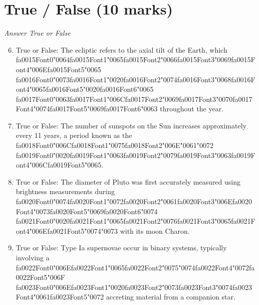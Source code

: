 \documentclass[12pt]{article}
\begin{document}
\section*{True / False (10 marks)}
\textit{Answer True or False}
\begin{enumerate}[label=\arabic*.]
\setcounter{enumi}{5}
\item True or False: The ecliptic refers to the axial tilt of the Earth, which {\csname fa0015Font0\endcsname\char"0064}{\csname fa0015Font1\endcsname\char"0065}{\csname fa0015Font2\endcsname\char"0066}{\csname fa0015Font3\endcsname\char"0069}{\csname fa0015Font4\endcsname\char"006E}{\csname fa0015Font5\endcsname\char"0065} {\csname fa0016Font0\endcsname\char"0073}{\csname fa0016Font1\endcsname\char"0020}{\csname fa0016Font2\endcsname\char"0074}{\csname fa0016Font3\endcsname\char"0068}{\csname fa0016Font4\endcsname\char"0065}{\csname fa0016Font5\endcsname\char"0020}{\csname fa0016Font6\endcsname\char"0065} {\csname fa0017Font0\endcsname\char"0063}{\csname fa0017Font1\endcsname\char"006C}{\csname fa0017Font2\endcsname\char"0069}{\csname fa0017Font3\endcsname\char"0070}{\csname fa0017Font4\endcsname\char"0074}{\csname fa0017Font5\endcsname\char"0069}{\csname fa0017Font6\endcsname\char"0063} throughout the year.
\item True or False: The number of sunspots on the Sun increases approximately every 11 years, a period known as the {\csname fa0018Font0\endcsname\char"006C}{\csname fa0018Font1\endcsname\char"0075}{\csname fa0018Font2\endcsname\char"006E}{\char"0061}{\char"0072} {\csname fa0019Font0\endcsname\char"0020}{\csname fa0019Font1\endcsname\char"0063}{\csname fa0019Font2\endcsname\char"0079}{\csname fa0019Font3\endcsname\char"0063}{\csname fa0019Font4\endcsname\char"006C}{\csname fa0019Font5\endcsname\char"0065}.
\item True or False: The diameter of Pluto was first accurately measured using brightness measurements during {\csname fa0020Font0\endcsname\char"0074}{\csname fa0020Font1\endcsname\char"0072}{\csname fa0020Font2\endcsname\char"0061}{\csname fa0020Font3\endcsname\char"006E}{\csname fa0020Font4\endcsname\char"0073}{\csname fa0020Font5\endcsname\char"0069}{\csname fa0020Font6\endcsname\char"0074} {\csname fa0021Font0\endcsname\char"0020}{\csname fa0021Font1\endcsname\char"0065}{\csname fa0021Font2\endcsname\char"0076}{\csname fa0021Font3\endcsname\char"0065}{\csname fa0021Font4\endcsname\char"006E}{\csname fa0021Font5\endcsname\char"0074}{\char"0073} with its moon Charon.
\item True or False: Type Ia supernovae occur in binary systems, typically involving a {\csname fa0022Font0\endcsname\char"006E}{\csname fa0022Font1\endcsname\char"0065}{\csname fa0022Font2\endcsname\char"0075}{\char"0074}{\csname fa0022Font4\endcsname\char"0072}{\csname fa0022Font5\endcsname\char"006F} {\csname fa0023Font0\endcsname\char"006E}{\csname fa0023Font1\endcsname\char"0020}{\csname fa0023Font2\endcsname\char"0073}{\csname fa0023Font3\endcsname\char"0074}{\csname fa0023Font4\endcsname\char"0061}{\csname fa0023Font5\endcsname\char"0072} accreting material from a companion star.

\end{enumerate}
\end{document}
